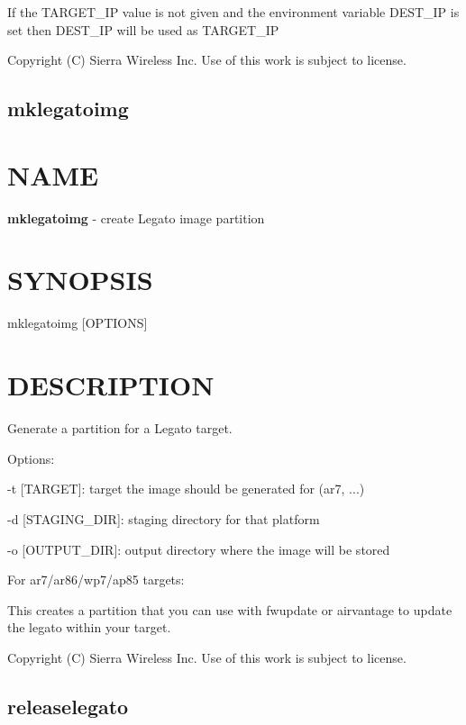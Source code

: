 \begin{DoxyVerb}If the TARGET_IP value is not given and the environment variable DEST_IP
is set then DEST_IP will be used as TARGET_IP
\end{DoxyVerb}




 Copyright (C) Sierra Wireless Inc. Use of this work is subject to license. \hypertarget{toolsHost_mklegatoimg}{}\subsection{mklegatoimg}\label{toolsHost_mklegatoimg}
\section*{N\+A\+M\+E}

{\bfseries mklegatoimg} -\/ create Legato image partition

\section*{S\+Y\+N\+O\+P\+S\+I\+S}

{\ttfamily mklegatoimg \mbox{[}O\+P\+T\+I\+O\+N\+S\mbox{]}}~\newline


\section*{D\+E\+S\+C\+R\+I\+P\+T\+I\+O\+N}

Generate a partition for a Legato target.

Options\+:
\begin{DoxyItemize}
\item -\/t \mbox{[}T\+A\+R\+G\+E\+T\mbox{]}\+: target the image should be generated for (ar7, ...)
\item -\/d \mbox{[}S\+T\+A\+G\+I\+N\+G\+\_\+\+D\+I\+R\mbox{]}\+: staging directory for that platform
\item -\/o \mbox{[}O\+U\+T\+P\+U\+T\+\_\+\+D\+I\+R\mbox{]}\+: output directory where the image will be stored
\end{DoxyItemize}

For ar7/ar86/wp7/ap85 targets\+:

This creates a partition that you can use with fwupdate or airvantage to update the legato within your target.



 Copyright (C) Sierra Wireless Inc. Use of this work is subject to license. \hypertarget{toolsHost_releaselegato}{}\subsection{releaselegato}\label{toolsHost_releaselegato}
